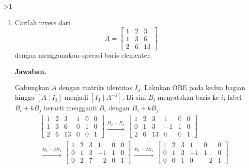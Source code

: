 \documentclass[12pt]{article}
\newcommand{\answername}{Jawaban}
\newenvironment{soaljawab}[1]{%
    \ifnum#1>1\clearpage\fi
    \begin{tcolorbox}[enhanced,breakable,height fill,height fixed for=all,
        sharp corners,colback=white,colframe=black,boxrule=0.4bp,
        boxsep=0pt,left=12bp,right=12bp,top=6bp,bottom=10bp,
        before skip=0pt,after skip=0pt,pad at break=8bp]
    \fontsize{12bp}{14bp}\selectfont
    \setlength{\abovedisplayskip}{8bp}
    \setlength{\belowdisplayskip}{8bp}
    \setlength{\abovedisplayshortskip}{8bp}
    \setlength{\belowdisplayshortskip}{8bp}
    \renewcommand{\arraystretch}{1.15}
    \begin{enumerate}[start=#1,topsep=0pt]
}{%
    \end{enumerate}
    \end{tcolorbox}
}
\newcommand{\jawaban}{\par\medskip\textbf{\answername.}\par\smallskip}
\begin{document}
\begin{soaljawab}{5}
\item Carilah invers dari
        \[
          A = \begin{bmatrix}
            1 & 2 & 3  \\
            1 & 3 & 6  \\
            2 & 6 & 13
          \end{bmatrix}
        \]
        dengan menggunakan operasi baris elementer.
\jawaban
Gabungkan $A$ dengan matriks identitas $I_3$. Lakukan OBE pada
kedua bagian hingga $[A\mid I_3]$ menjadi $[I_3\mid A^{-1}]$.
Di sini $B_i$ menyatakan baris ke-$i$; label $B_i+kB_j$ berarti
mengganti $B_i$ dengan $B_i+kB_j$.
{\setlength{\arraycolsep}{4bp}
\begin{align*}
    & \left[\begin{array}{ccc|ccc}
            1 & 2 & 3 & 1 & 0 & 0 \\
            1 & 3 & 6 & 0 & 1 & 0 \\
            2 & 6 & 13 & 0 & 0 & 1
        \end{array}\right]
        \begin{array}{c}\xrightarrow{B_2-B_1}\end{array}
        \left[\begin{array}{ccc|ccc}
            1 & 2 & 3 & 1 & 0 & 0 \\
            0 & 1 & 3 & -1 & 1 & 0 \\
            2 & 6 & 13 & 0 & 0 & 1
        \end{array}\right] \\[6bp]
    & \begin{array}{c}\xrightarrow{B_3-2B_1}\end{array}
        \left[\begin{array}{ccc|ccc}
            1 & 2 & 3 & 1 & 0 & 0 \\
            0 & 1 & 3 & -1 & 1 & 0 \\
            0 & 2 & 7 & -2 & 0 & 1
        \end{array}\right]
        \begin{array}{c}\xrightarrow{B_3-2B_2}\end{array}
        \left[\begin{array}{ccc|ccc}
            1 & 2 & 3 & 1 & 0 & 0 \\
            0 & 1 & 3 & -1 & 1 & 0 \\
            0 & 0 & 1 & 0 & -2 & 1
        \end{array}\right] \\[6bp]

\end{align*}}
\end{soaljawab}
\end{document}
